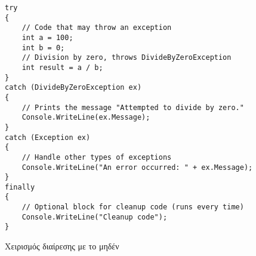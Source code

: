 \begin{listing}[htbp]
\begin{verbatim}
try
{
    // Code that may throw an exception
    int a = 100;
    int b = 0;
    // Division by zero, throws DivideByZeroException
    int result = a / b;  
}
catch (DivideByZeroException ex)
{
    // Prints the message "Attempted to divide by zero."
    Console.WriteLine(ex.Message);
}
catch (Exception ex)
{
    // Handle other types of exceptions
    Console.WriteLine("An error occurred: " + ex.Message);
}
finally
{
    // Optional block for cleanup code (runs every time)
    Console.WriteLine("Cleanup code");
}
\end{verbatim}
\caption{Χειρισμός διαίρεσης με το μηδέν}
\label{exception_handling}
\end{listing}